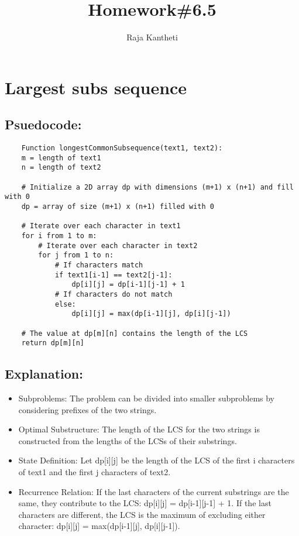 \documentclass[10pt]{article}
\title{Homework\#6.5}
\author{Raja Kantheti}
\begin{document}
\maketitle
\section{Largest subs sequence}
\subsection{Psuedocode:}
\begin{verbatim}
    Function longestCommonSubsequence(text1, text2):
    m = length of text1
    n = length of text2

    # Initialize a 2D array dp with dimensions (m+1) x (n+1) and fill with 0
    dp = array of size (m+1) x (n+1) filled with 0

    # Iterate over each character in text1
    for i from 1 to m:
        # Iterate over each character in text2
        for j from 1 to n:
            # If characters match
            if text1[i-1] == text2[j-1]:
                dp[i][j] = dp[i-1][j-1] + 1
            # If characters do not match
            else:
                dp[i][j] = max(dp[i-1][j], dp[i][j-1])

    # The value at dp[m][n] contains the length of the LCS
    return dp[m][n]
\end{verbatim}
\subsection{Explanation:}
\begin{itemize}
    \item Subproblems: The problem can be divided into smaller subproblems by considering prefixes of the two strings.
    \item Optimal Substructure: The length of the LCS for the two strings is constructed from the lengths of the LCSs of their substrings.
    \item State Definition: Let dp[i][j] be the length of the LCS of the first i characters of text1 and the first j characters of text2.
    \item Recurrence Relation:
    If the last characters of the current substrings are the same, they contribute to the LCS: dp[i][j] = dp[i-1][j-1] + 1.
    If the last characters are different, the LCS is the maximum of excluding either character: dp[i][j] = max(dp[i-1][j], dp[i][j-1]).
\end{itemize}
\end{document}
